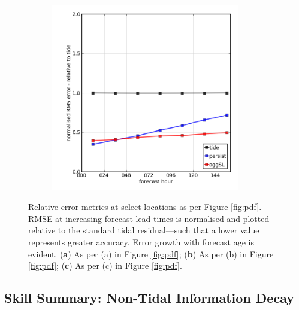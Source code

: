 \begin{figure}[H]
\begin{subfigure}{0.30\textwidth}
    \caption{}
    \end{subfigure}
    \begin{subfigure}{0.30\textwidth}
    \includegraphics[width=0.9\textwidth]{figures/plots/0003_rms_growth.png}
    \caption{}
    \end{subfigure}
    \caption{ Relative error metrics at select locations as per Figure \ref{fig:pdf}. RMSE at increasing forecast lead times is normalised and plotted relative to the standard tidal residual---such that a lower value represents greater accuracy. Error growth with forecast age is evident. (\textbf{a}) As per (a) in Figure \ref{fig:pdf}; (\textbf{b}) As per (b) in Figure \ref{fig:pdf}; (\textbf{c}) As per (c) in Figure \ref{fig:pdf}.} \vspace{-13pt}
    \label{fig:rms}
\end{figure}   

\subsection{Skill Summary: Non-Tidal Information Decay}
\label{sec:skill}

